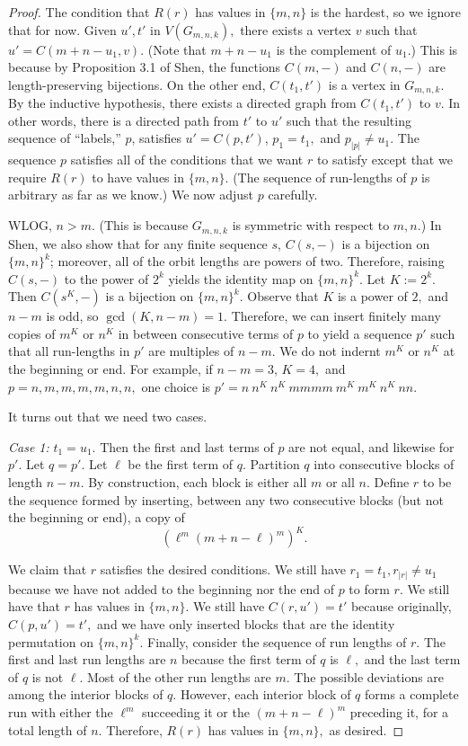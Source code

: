 \documentclass[11pt]{amsart} %
\begin{document}
\begin{proof}
The condition that $R(r)$ has values in $\{m, n\}$ is the hardest, so we ignore that for now. Given $u', t'$ in $V(G_{m, n, k}),$ there exists a vertex $v$ such that $u' = C(m+n-u_1, v).$ (Note that $m+n-u_1$ is the complement of $u_1$.) This is because by Proposition 3.1 of Shen\cite{Shen}, the functions $C(m, -)$ and $C(n, -)$ are length-preserving bijections. On the other end, $C(t_1, t')$ is a vertex in $G_{m, n, k}.$ By the inductive hypothesis, there exists a directed graph from $C(t_1, t')$ to $v.$ In other words, there is a directed path from $t'$ to $u'$ such that the resulting sequence of ``labels,'' $p$, satisfies $u' = C(p, t')$, $p_1 = t_1,$ and $p_{|p|} \neq u_1.$ The sequence $p$ satisfies all of the conditions that we want $r$ to satisfy except that we require $R(r)$ to have values in $\{m, n\}.$ (The sequence of run-lengths of $p$ is arbitrary as far as we know.) We now adjust $p$ carefully.

WLOG, $n > m.$ (This is because $G_{m, n, k}$ is symmetric with respect to $m, n$.) In Shen\cite{Shen}, we also show that for any finite sequence $s$, $C(s, -)$ is a bijection on $\{m, n\}^{k}$; moreover, all of the orbit lengths are powers of two. Therefore, raising $C(s, -)$ to the power of $2^k$ yields the identity map on $\{m, n\}^k.$ Let $K:= 2^k.$ Then $C(s^K, -)$ is a bijection on $\{m, n\}^k.$ Observe that $K$ is a power of $2,$ and $n-m$ is odd, so $\gcd(K, n-m) = 1.$ Therefore, we can insert finitely many copies of $m^K$ or $n^K$ in between consecutive terms of $p$ to yield a sequence $p'$ such that all run-lengths in $p'$ are multiples of $n-m.$ We do not indernt $m^K$ or $n^K$ at the beginning or end. For example, if $n-m = 3$, $K = 4,$ and $p = n, m, m, m, m, n, n,$ one choice is $p' = n \ n^K \ n^K \ mmmm \ m^K \ m^K \ n^K \ nn.$ 

It turns out that we need two cases.

 \textit{Case 1:} $t_1 = u_1.$ Then the first and last terms of $p$ are not equal, and likewise for $p'.$ Let $q = p'.$ Let $\ell$ be the first term of $q.$ Partition $q$ into consecutive blocks of length $n-m.$ By construction, each block is either all $m$ or all $n.$ Define $r$ to be the sequence formed by inserting, between any two consecutive blocks (but not the beginning or end), a copy of 
 \[ \left(\ell^{m}(m+n-\ell)^{m} \right)^K. \] 
 
 We claim that $r$ satisfies the desired conditions. We still have $r_1 = t_1, r_{|r|} \neq u_1$ because we have not added to the beginning nor the end of $p$ to form $r.$ We still have that $r$ has values in $\{m, n\}.$ We still have $C(r, u') = t'$ because originally, $C(p, u') = t',$ and we have only inserted blocks that are the identity permutation on $\{m, n\}^k.$ Finally, consider the sequence of run lengths of $r.$ The first and last run lengths are $n$ because the first term of $q$ is $\ell,$ and the last term of $q$ is not $\ell.$ Most of the other run lengths are $m.$ The possible deviations are among the interior blocks of $q.$ However, each interior block of $q$ forms a complete run with either the $\ell^m$ succeeding it or the $(m+n-\ell)^m$ preceding it, for a total length of $n.$ Therefore, $R(r)$ has values in $\{m, n\},$ as desired.
 

\end{proof}
\end{document}
